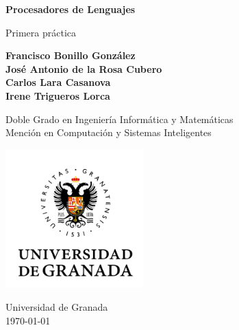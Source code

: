 \begin{titlepage}
   \begin{center}
       \vspace*{1cm}

       {\LARGE\textbf{Procesadores de Lenguajes}}

       \vspace{0.5cm}
        {\Large Primera práctica}

       \vspace{1.5cm}

       \textbf{
           Francisco Bonillo González\\
           José Antonio de la Rosa Cubero\\
           Carlos Lara Casanova\\
           Irene Trigueros Lorca
       }

       \vfill

       Doble Grado en Ingeniería Informática y Matemáticas\\
       Mención en Computación y Sistemas Inteligentes

       \vspace{0.8cm}

       \includegraphics[width=0.4\textwidth]{university.png}

       Universidad de Granada\\
           \today{}\\

   \end{center}
\end{titlepage}
